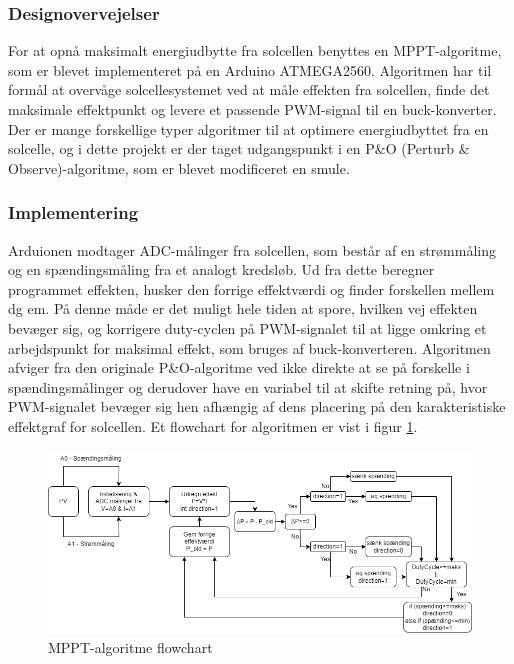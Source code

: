 \documentclass[../main.tex]{subfiles}
\begin{document}
    \subsubsection{Designovervejelser}
    For at opnå maksimalt energiudbytte fra solcellen benyttes en MPPT-algoritme, som er blevet implementeret på en Arduino ATMEGA2560. Algoritmen har til formål at overvåge solcellesystemet ved at måle effekten fra solcellen, finde det maksimale effektpunkt og levere et passende PWM-signal til en buck-konverter. Der er mange forskellige typer algoritmer til at optimere energiudbyttet fra en solcelle, og i dette projekt er der taget udgangspunkt i en P&O (Perturb & Observe)-algoritme, som er blevet modificeret en smule.

    \subsubsection{Implementering}
    Arduionen modtager ADC-målinger fra solcellen, som består af en strømmåling og en spændingsmåling fra et analogt kredsløb. Ud fra dette beregner programmet effekten, husker den forrige effektværdi og finder forskellen mellem dg em. På denne måde er det muligt hele tiden at spore, hvilken vej effekten bevæger sig, og korrigere duty-cyclen på PWM-signalet til at ligge omkring et arbejdspunkt for maksimal effekt, som bruges af buck-konverteren. Algoritmen afviger fra den originale P&O-algoritme ved ikke direkte at se på forskelle i spændingsmålinger og derudover have en variabel til at skifte retning på, hvor PWM-signalet bevæger sig hen afhængig af dens placering på den karakteristiske effektgraf for solcellen. Et flowchart for algoritmen er vist i figur \ref{fig: MPPT Flowchart}.
        
    \begin{figure}[H]
      \includegraphics[width=\textwidth]{Dokumentation/mpptflowchart.drawio (1).png}
     \caption{MPPT-algoritme flowchart}
     \label{fig: MPPT Flowchart}
     \end{figure}
    
\end{document}
